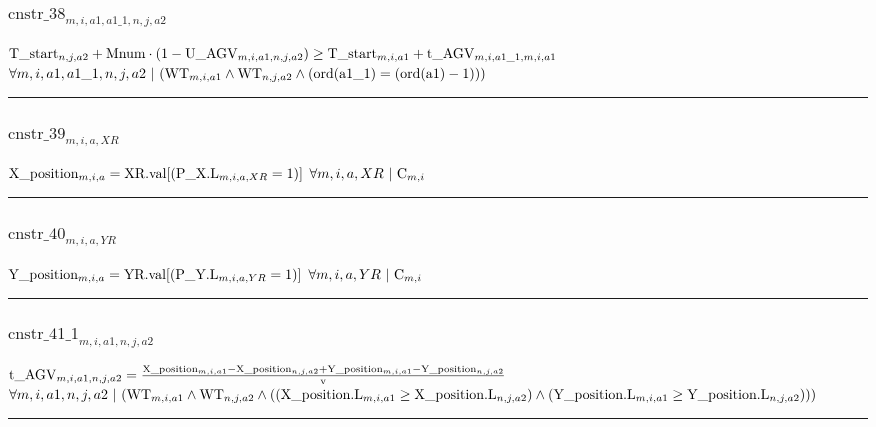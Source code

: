 \documentclass[11pt]{article}
\begin{document}
\subsubsection*{$\text{cnstr\_38}_{m, i, a1, a1\_1, n, j, a2}$} \label{cnstr_38}
$
\textcolor{black}{\text{T\_start}}_{n, j, a2} + \textcolor{black}{\text{Mnum}} \cdot  ( 1 - \textcolor{black}{\text{U\_AGV}}_{m, i, a1, n, j, a2} )  \geq \textcolor{black}{\text{T\_start}}_{m, i, a1} + \textcolor{black}{\text{t\_AGV}}_{m, i, a1\_1, m, i, a1}
$
\hfill
$
\forall{ m, i, a1, a1\_1, n, j, a2}  ~ | ~ ( \textcolor{black}{\text{WT}}_{m, i, a1} \wedge \textcolor{black}{\text{WT}}_{n, j, a2} \wedge  (  \text{ord}( \textcolor{black}{\text{a1\_1}} )   =   (  \text{ord}( \textcolor{black}{\text{a1}} )  - 1 )  )  )
$ \vspace{5pt}
\hrule 
\subsubsection*{$\text{cnstr\_39}_{m, i, a, XR}$} \label{cnstr_39}
$
\textcolor{black}{\text{X\_position}}_{m, i, a} = \textcolor{black}{\text{XR.val}} [  ( \textcolor{black}{\text{P\_X.L}}_{m, i, a, XR}  =  1 )  ] 
$
\hfill
$
\forall{ m, i, a, XR}  ~ | ~\textcolor{black}{\text{C}}_{m, i}
$ \vspace{5pt}
\hrule 
\subsubsection*{$\text{cnstr\_40}_{m, i, a, YR}$} \label{cnstr_40}
$
\textcolor{black}{\text{Y\_position}}_{m, i, a} = \textcolor{black}{\text{YR.val}} [  ( \textcolor{black}{\text{P\_Y.L}}_{m, i, a, YR}  =  1 )  ] 
$
\hfill
$
\forall{ m, i, a, YR}  ~ | ~\textcolor{black}{\text{C}}_{m, i}
$ \vspace{5pt}
\hrule 
\subsubsection*{$\text{cnstr\_41\_1}_{m, i, a1, n, j, a2}$} \label{cnstr_41_1}
$
\textcolor{black}{\text{t\_AGV}}_{m, i, a1, n, j, a2} =  \frac{\textcolor{black}{\text{X\_position}}_{m, i, a1} - \textcolor{black}{\text{X\_position}}_{n, j, a2} + \textcolor{black}{\text{Y\_position}}_{m, i, a1} - \textcolor{black}{\text{Y\_position}}_{n, j, a2}}{\textcolor{black}{\text{v}}} 
$
\hfill
$
\forall{ m, i, a1, n, j, a2}  ~ | ~ ( \textcolor{black}{\text{WT}}_{m, i, a1} \wedge \textcolor{black}{\text{WT}}_{n, j, a2} \wedge  (  ( \textcolor{black}{\text{X\_position.L}}_{m, i, a1}  \geq  \textcolor{black}{\text{X\_position.L}}_{n, j, a2} )  \wedge  ( \textcolor{black}{\text{Y\_position.L}}_{m, i, a1}  \geq  \textcolor{black}{\text{Y\_position.L}}_{n, j, a2} )  ) )
$ \vspace{5pt}
\hrule 
\end{document}
